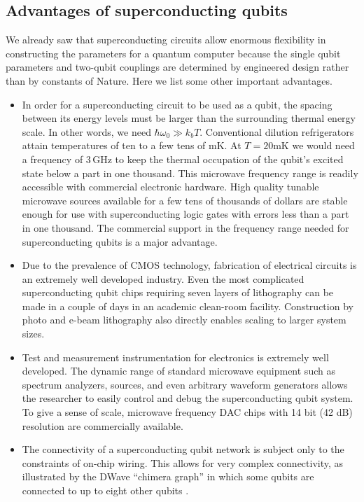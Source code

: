 \subsection{Advantages of superconducting qubits}

We already saw that superconducting circuits allow enormous flexibility in constructing the parameters for a quantum computer because the single qubit parameters and two-qubit couplings are determined by engineered design rather than by constants of Nature. Here we list some other important advantages.

\begin{itemize}
\item In order for a superconducting circuit to be used as a qubit, the spacing between its energy levels must be larger than the surrounding thermal energy scale. In other words, we need $\hbar \omega_0 \gg k_b T$. Conventional dilution refrigerators attain temperatures of ten to a few tens of mK. At $T=20\textrm{mK}$ we would need a frequency of 3\,GHz to keep the thermal occupation of the qubit's excited state below a part in one thousand. This microwave frequency range is readily accessible with commercial electronic hardware. High quality tunable microwave sources available for a few tens of thousands of dollars are stable enough for use with superconducting logic gates with errors less than a part in one thousand. The commercial support in the frequency range needed for superconducting qubits is a major advantage.

\item Due to the prevalence of CMOS technology, fabrication of electrical circuits is an extremely well developed industry. Even the most complicated superconducting qubit chips requiring seven layers of lithography can be made in a couple of days in an academic clean-room facility. Construction by photo and e-beam lithography also directly enables scaling to larger system sizes.

\item Test and measurement instrumentation for electronics is extremely well developed. The dynamic range of standard microwave equipment such as spectrum analyzers, sources, and even arbitrary waveform generators allows the researcher to easily control and debug the superconducting qubit system. To give a sense of scale, microwave frequency DAC chips with 14 bit (42 dB) resolution are commercially available.

\item The connectivity of a superconducting qubit network is subject only to the constraints of on-chip wiring. This allows for very complex connectivity, as illustrated by the DWave ``chimera graph'' in which some qubits are connected to up to eight other qubits \cite{Boixo:annealing100Qubits2013}.
\end{itemize}

